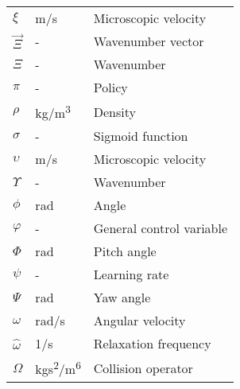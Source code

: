 \begin{longtable}{p{5cm}p{4cm}p{5cm}}
    $\xi$    		    & \si{m/s}      	& Microscopic velocity \\
   	$\vec{\Xi}$			& \si{-}			& Wavenumber vector\\
 	$\Xi$				& \si{-}			& Wavenumber\\
    $\pi$				& \si{-}			& Policy \\
    $\rho$              & \si{kg/m\cubed}   & Density \\
    $\sigma$			& \si{-}			& Sigmoid function \\
    $\upsilon$			& \si{m/s}			& Microscopic velocity \\
    $\Upsilon$			& \si{-}			& Wavenumber \\
 	$\phi$				& \si{rad}			& Angle \\
    $\varphi$			& \si{-}			& General control variable\\
    $\Phi$				& \si{rad}			& Pitch angle \\
    $\psi$				& \si{-}			& Learning rate \\
    $\Psi$				& \si{rad}			& Yaw angle \\
    $\omega$			& \si{rad/s}		& Angular velocity \\
    $\hat{\omega}$		& \si{1/s}			& Relaxation frequency \\
    $\Omega$            & \si{kgs\squared/m\tothe{6}}  & Collision operator \\
\end{longtable}


